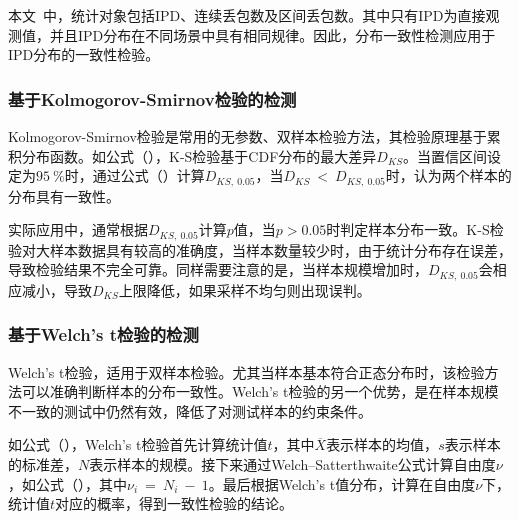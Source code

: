 本文\ 中，统计对象包括IPD、连续丢包数及区间丢包数。其中只有IPD为直接观测值，并且IPD分布在不同场景中具有相同规律。因此，分布一致性检测应用于IPD分布的一致性检验。

\subsubsection{基于Kolmogorov-Smirnov检验的检测}
\label{chap:analyze:statistical:test:ks}

Kolmogorov-Smirnov检验是常用的无参数、双样本检验方法，其检验原理基于累积分布函数。如公式（），K-S检验基于CDF分布的最大差异$D_{KS}$。当置信区间设定为$95\ \%$时，通过公式（）计算$D_{KS,\ 0.05}$，当$D_{KS}\ <\ D_{KS,\ 0.05}$时，认为两个样本的分布具有一致性。

实际应用中，通常根据$D_{KS,\ 0.05}$计算$p$值，当$p> 0.05$时判定样本分布一致。K-S检验对大样本数据具有较高的准确度，当样本数量较少时，由于统计分布存在误差，导致检验结果不完全可靠。同样需要注意的是，当样本规模增加时，$D_{KS,\ 0.05}$会相应减小，导致$D_{KS}$上限降低，如果采样不均匀则出现误判。

\subsubsection{基于Welch's t检验的检测}
\label{chap:analyze:statistical:test:t}

Welch's t检验，适用于双样本检验。尤其当样本基本符合正态分布时，该检验方法可以准确判断样本的分布一致性。Welch's t检验的另一个优势，是在样本规模不一致的测试中仍然有效，降低了对测试样本的约束条件。

如公式（），Welch's t检验首先计算统计值$t$，其中$\overline{X}$表示样本的均值，$s$表示样本的标准差，$N$表示样本的规模。接下来通过Welch–Satterthwaite公式计算自由度$\nu$，如公式（），其中$\nu_{i}\ =\ N_{i}\ -\ 1$。最后根据Welch's t值分布，计算在自由度$\nu$下，统计值$t$对应的概率，得到一致性检验的结论。

